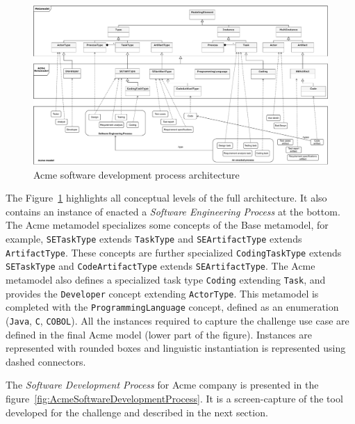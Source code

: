 \begin{figure}
 \centering
     \includegraphics[width=1.0 \textwidth]{Figures/AcmeFullArchitecture.pdf}
     \caption{Acme software development process architecture}
    \label{fig:AcmeFullArchitecture}
\end{figure}


The Figure~\ref{fig:AcmeFullArchitecture} highlights all conceptual levels of the full architecture. It also contains an instance of enacted a \textit{Software Engineering Process} at the bottom. The Acme metamodel specializes some concepts of the Base metamodel, for example, \texttt{SETaskType} extends \texttt{TaskType} and \texttt{SEArtifactType} extends \texttt{ArtifactType}. These concepts are further specialized  \texttt{CodingTaskType} extends \texttt{SETaskType} and \texttt{CodeArtifactType} extends \texttt{SEArtifactType}. 
The Acme metamodel also defines a specialized task type \texttt{Coding} extending \texttt{Task}, and provides the \texttt{Developer} concept extending \texttt{ActorType}. This metamodel is completed with the \texttt{ProgrammingLanguage} concept, defined as an enumeration (\texttt{Java}, \texttt{C}, \texttt{COBOL}). All the instances required to capture the challenge use case are defined in the final Acme model (lower part of the figure). Instances are represented with rounded boxes and linguistic instantiation is represented using dashed connectors.

The \textit{Software Development Process} for Acme company is presented in the figure~\ref{fig:AcmeSoftwareDevelopmentProcess}. It is a screen-capture of the tool developed for the challenge and described in the next section. 

